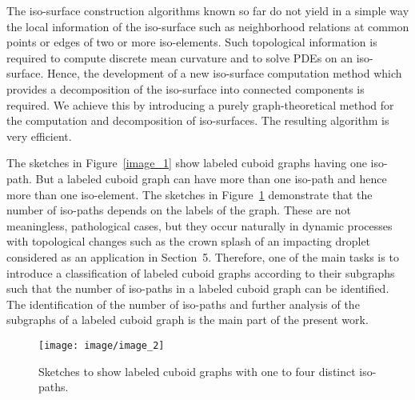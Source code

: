 \documentclass[a4paper,11pt]{article}
\begin{document}
The iso-surface construction algorithms known so far do not yield in a simple way the local
information of the iso-surface such as neighborhood relations at common points or
edges of two or more iso-elements. Such topological information is required
to compute discrete mean curvature and to solve PDEs on an iso-surface. Hence, the development of a
new iso-surface computation method which provides a decomposition of the iso-surface into connected
components is required. We achieve this by introducing a purely graph-theoretical method for the
computation and decomposition of iso-surfaces. The resulting algorithm is very efficient.

The sketches in Figure~\ref{image_1} show labeled cuboid graphs having one iso-path.
But a labeled cuboid graph can have more than one iso-path and hence more than
one iso-element. The sketches in Figure~\ref{image_2} demonstrate that the number of
iso-paths depends on the labels of the graph. These are not meaningless, pathological cases, but they
occur naturally in dynamic processes with topological changes such as the crown splash of an impacting
droplet considered as an application in Section~5. Therefore, one of the main tasks is to introduce a
classification of labeled
cuboid graphs according to their subgraphs such that the number of iso-paths in a labeled cuboid graph
can be identified. The identification of the number of iso-paths and further analysis of the subgraphs of
a labeled cuboid graph is the main part of the present work.
\begin{figure}[!ht]
\texttt{[image: image/image\_2]}
\caption{Sketches  to  show labeled cuboid graphs with one to four distinct iso-paths.}
\label{image_2}
\end{figure}
\end{document}
